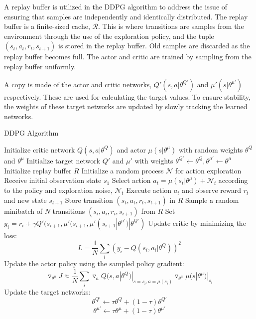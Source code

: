 \documentclass[conference]{IEEEtran}
\begin{document}
A replay buffer is utilized in the DDPG algorithm to address the issue of ensuring that samples are independently and identically distributed. The replay buffer is a finite-sized cache, $\mathcal{R}$. This is where transitions are samples from the environment through the use of the exploration policy, and the tuple $(s_t,a_t,r_t,s_{t+1})$ is stored in the replay buffer. Old samples are discarded as the replay buffer becomes full. The actor and critic are trained by sampling from the replay buffer uniformly. 

A copy is made of the actor and critic networks, $Q'(s,a|\theta^{Q'})$ and $\mu'(s|\theta^{\mu'})$ respectively. These are used for calculating the target values. To ensure stability, the weights of these target networks are updated by slowly tracking the learned networks.

\begin{algorithm}
\caption{DDPG Algorithm \cite{Hunt2016a}}
\begin{algorithmic}[1]
  \footnotesize
  \STATE Initialize critic network $Q(s,a|\theta^Q)$ and actor $\mu(s|\theta^\mu)$ with random weights $\theta^Q$ and $\theta^\mu$
  \STATE Initialize target network $Q'$ and $\mu'$ with weights $\theta^{Q'}\leftarrow\theta^Q,\theta^{\mu'}\leftarrow \theta^{\mu}$
  \STATE Initialize replay buffer $R$
        \STATE Initialize a random process $\mathcal{N}$ for action exploration
        \STATE Receive initial observation state $s_1$
        	\STATE Select action $a_t=\mu(s_t|\theta^{\mu})+\mathcal{N}_t$ according to the policy and exploration noise, $\mathcal{N}_t$
        	\STATE Execute action $a_t$ and observe reward $r_t$ and new state $s_{t+1}$
        	\STATE Store transition $(s_t, a_t, r_t, s_{t+1})$ in $R$
        	\STATE Sample a random minibatch of $N$ transitions $(s_i, a_i, r_i, s_{i+1})$ from $R$
        	\STATE Set $y_i=r_i+\gamma Q'(s_{i+1},\mu'(s_{i+1},\mu'(s_{i+1}|\theta^{\mu'})|\theta^{Q'})$
        	\STATE Update critic by minimizing the loss: $$L=\frac{1}{N}\sum_i(y_i-Q(s_i,a_i|\theta^Q))^2$$
        	\STATE Update the actor policy using the sampled policy gradient: $$\triangledown_{\theta^\mu}J\approx \frac{1}{N}\sum_i\triangledown_a Q(s,a|\theta^Q)|_{s=s_i,a=\mu(s_i)}\triangledown_{\theta^\mu}\mu(s|\theta^\mu)|_{s_i}$$
        	\STATE Update the target networks:
        	$$\theta^{Q'}\leftarrow\tau\theta^Q+(1-\tau)\theta^{Q'}$$
        	$$\theta^{\mu'}\leftarrow\tau\theta^\mu+(1-\tau)\theta^{\mu'}$$
        \ENDFOR
      \ENDFOR
\end{algorithmic}
\end{algorithm}
\end{document}
